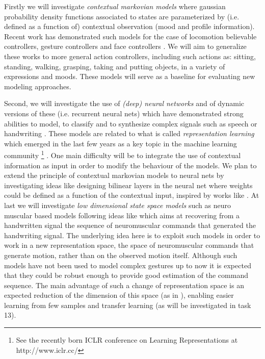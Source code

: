   Firstly we will investigate {\it contextual markovian models} where gaussian probability density functions associated to states are parameterized by (i.e. defined as a function of) contextual observation (mood and profile information). Recent work has demonstrated such models for the case of locomotion believable controllers, gesture controllers \cite{DBLP:journals/tog/LevineKTK10} and face controllers \cite{Radenen2014, Ding2013, Ding2014}. We will aim to generalize these works to more general action controllers, including such actions as: sitting, standing, walking, grasping, taking and putting objects, in a variety of expressions and moods. These models will serve as a baseline for evaluating new modeling approaches.

  Second, we will investigate the use of {\it (deep) neural networks} and of dynamic versions of these (i.e. recurrent neural nets) which have demonstrated strong abilities to model, to classify and to synthesize complex signals such as speech or handwriting \cite{DBLP:journals/taslp/Abdel-HamidMJDPY14, DBLP:journals/corr/abs-1303-5778, DBLP:conf/interspeech/Abdel-HamidDYJ13, DBLP:journals/spm/LingKZSSQMD15, DBLP:conf/nips/GravesS08, DBLP:journals/corr/Graves13}. 
  These models are related to what is called {\it representation learning} which emerged in the last few years as a key topic in the machine learning community \footnote{See the recently born ICLR conference on Learning Representations at http://www.iclr.cc/} \cite{DBLP:journals/corr/ContardoDAG13}. 
  One main difficulty will be to integrate the use of contextual information as input in order to modify the behaviour of the models. We plan to extend the principle of contextual markovian models to neural nets by investigating ideas like designing bilinear layers in the neural net where weights could be defined as a function of the contextual input, inspired by works like \cite{DBLP:conf/mm/ZhongLL11, DBLP:journals/pami/HutchinsonDY13}.
  At last we will investigate {\it low dimensional state space models} such as neuro muscular based models following ideas like \cite{DBLP:conf/icfhr/FischerPOS14} which aims at recovering from a handwritten signal the sequence of neuromuscular commands that generated the handwriting signal. The underlying idea here is to exploit such models in order to work in a new representation space, the space of neuromuscular commands that generate motion, rather than on the observed motion itself. 
  Although such models have not been used to model complex gestures up to now it is expected that they could be robust enough to provide good estimation of the command sequence. The main advantage of such a change of representation space is an expected reduction of the dimension of this space (as in \cite{DBLP:journals/pami/WangFH08}), enabling easier learning from few samples and transfer learning (as will be investigated in task 13).
% 



